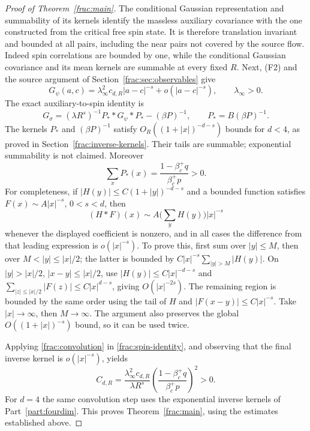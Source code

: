 \documentclass[11pt]{article}
\begin{document}
\begin{proof}[Proof of Theorem~\ref{frac:main}]
The conditional Gaussian representation and summability of its
kernels identify the massless auxiliary covariance with the one
constructed from the critical free spin state. It is therefore
translation invariant and bounded at all pairs, including the near
pairs not covered by the source flow. Indeed spin correlations are
bounded by one, while the conditional Gaussian covariance and its mean kernels
are summable at every fixed \(R\). Next, (F2) and the source argument
of Section~\ref{frac:sec:observables} give
\begin{equation}\label{frac:aux-asymptotic}
 G_\psi(a,c)=\lambda_\infty^2c_{d,R}|a-c|^{-s}
                    +o(|a-c|^{-s}),\qquad \lambda_\infty>0.
\end{equation}
The exact auxiliary-to-spin identity is
\begin{equation}\label{frac:spin-identity}
 G_\sigma=(\lambda R^s)^{-1}P_* *G_\psi*P_*-(\beta P)^{-1},
 \qquad P_*=B(\beta P)^{-1}.
\end{equation}
The kernels \(P_*\) and \((\beta P)^{-1}\) satisfy
\(O_R((1+|x|)^{-d-s})\) bounds for \(d<4\), as proved in
Section~\ref{frac:inverse-kernels}. Their tails are summable; exponential
summability is not claimed. Moreover
\[
 \sum_xP_*(x)=\frac{1-\beta_c^+q}{\beta_c^+p}>0.
\]
For completeness, if \(|H(y)|\le C(1+|y|)^{-d-s}\) and a bounded
function satisfies \(F(x)\sim A|x|^{-s}\), \(0<s<d\), then
\begin{equation}\label{frac:convolution}
 (H*F)(x)\sim A\Big(\sum_yH(y)\Big)|x|^{-s}
\end{equation}
whenever the displayed coefficient is nonzero, and in all cases
the difference from that leading expression is \(o(|x|^{-s})\).
To prove this, first sum over \(|y|\le M\), then over
\(M<|y|\le|x|/2\); the latter is bounded by
\(C|x|^{-s}\sum_{|y|>M}|H(y)|\). On
\(|y|>|x|/2\), \(|x-y|\le |x|/2\), use
\(|H(y)|\le C|x|^{-d-s}\) and
\(\sum_{|z|\le |x|/2}|F(z)|\le C|x|^{d-s}\), giving
\(O(|x|^{-2s})\). The remaining region is bounded by the same
order using the tail of \(H\) and \(|F(x-y)|\le C|x|^{-s}\).
Take \(|x|\to\infty\), then \(M\to\infty\). The argument also
preserves the global \(O((1+|x|)^{-s})\) bound, so it can be used twice.

Applying \eqref{frac:convolution} in \eqref{frac:spin-identity}, and
observing that the final inverse kernel is \(o(|x|^{-s})\), yields
\[
 C_{d,R}=\frac{\lambda_\infty^2 c_{d,R}}{\lambda R^s}
       \left(\frac{1-\beta_c^+q}{\beta_c^+p}\right)^2>0.
\]
For \(d=4\) the same convolution step uses the exponential inverse
kernels of Part~\ref{part:fourdim}. This proves Theorem~\ref{frac:main}, using the estimates established above.

\end{proof}
\end{document}
